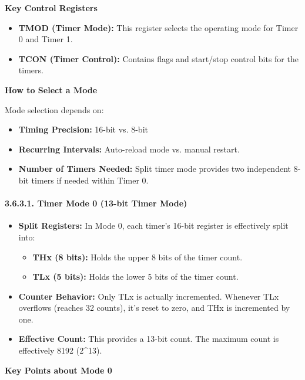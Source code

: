 \documentclass[
]{article}
\begin{document}
\textbf{Key Control Registers}

\begin{itemize}
\item
  \textbf{TMOD (Timer Mode):} This register selects the operating mode
  for Timer 0 and Timer 1.
\item
  \textbf{TCON (Timer Control):} Contains flags and start/stop control
  bits for the timers.
\end{itemize}

\textbf{How to Select a Mode}

Mode selection depends on:

\begin{itemize}
\item
  \textbf{Timing Precision:} 16-bit vs. 8-bit
\item
  \textbf{Recurring Intervals:} Auto-reload mode vs. manual restart.
\item
  \textbf{Number of Timers Needed:} Split timer mode provides two
  independent 8-bit timers if needed within Timer 0.
\end{itemize}

\hypertarget{3631-timer-mode-0-13-bit-timer-mode}{%
\paragraph{3.6.3.1. Timer Mode 0 (13-bit Timer
Mode)}\label{3631-timer-mode-0-13-bit-timer-mode}}

\begin{itemize}
\item
  \textbf{Split Registers:} In Mode 0, each timer's 16-bit register is
  effectively split into:

  \begin{itemize}
  \item
    \textbf{THx (8 bits):} Holds the upper 8 bits of the timer count.
  \item
    \textbf{TLx (5 bits):} Holds the lower 5 bits of the timer count.
  \end{itemize}
\item
  \textbf{Counter Behavior:} Only TLx is actually incremented. Whenever
  TLx overflows (reaches 32 counts), it's reset to zero, and THx is
  incremented by one.
\item
  \textbf{Effective Count:} This provides a 13-bit count. The maximum
  count is effectively 8192 (2\^{}13).
\end{itemize}

\textbf{Key Points about Mode 0}
\end{document}
